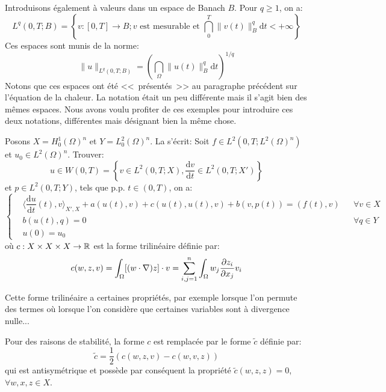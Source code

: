 \medskip
Introduisons également  à valeurs dans un espace
de Banach $B$. Pour $q\ge1$, on a:
\begin{equation}
L^q(0,T;B) =\left\{ v: [0,T]\rightarrow B; v \text{ est mesurable  et }
\dint_0^T \|v(t)\|^q_B \mathrm dt<+\infty\right\}
\end{equation}
Ces espaces sont munis de la norme:
\begin{equation}
\|u\|_{L^q(0,T;B)} = \left(\dint_\Omega\|u(t)\|^q_B \mathrm dt\right)^{1/q}
\end{equation}
Notons que ces espaces ont été <<~présentés~>> au paragraphe précédent
sur l'équation de la chaleur. La notation était un peu différente mais il s'agit bien
des mêmes espaces. Nous avons voulu profiter de ces exemples pour introduire
ces deux notations, différentes mais désignant bien la même chose.

\medskip
Posons $X=H^1_0(\Omega)^n$ et $Y=L^2_0(\Omega)^n$.
\medskip
La  s'écrit: Soit $f\in L^2(0,T;L^2(\Omega)^n)$ et $u_0\in L^2(\Omega)^n$.
Trouver:
\begin{equation}u\in W(0,T)=\left\{v\in L^2(0,T;X), \dfrac{\mathrm dv}{\mathrm dt}\in L^2(0,T;X') \right\}\end{equation} et
$p\in L^2(0,T;Y)$, tels que p.p. $t\in(0,T)$, on a:
\begin{equation}\left\{
\begin{aligned}
&\langle\dfrac{\mathrm du}{\mathrm dt}(t),v\rangle_{X',X}+a(u(t),v)+c(u(t),u(t),v)+b(v,p(t)) = (f(t),v) &&
\forall v\in X\\
&b(u(t),q) =0 &&\forall q \in Y\\
&u(0)=u_0
\end{aligned}\right.
\end{equation}
où $c: X\times X\times X\rightarrow\mathbb R$ est la forme trilinéaire définie par:
\begin{equation}
c(w,z,v) = \dint_\Omega [(w\cdot\nabla)z]\cdot v %
=\dsum_{i,j=1}^n \dint_\Omega w_j\dfrac{\partial z_i}{\partial x_j} v_i %
\end{equation}

\medskip
Cette forme trilinéaire a certaines propriétés, par exemple lorsque l'on permute
des termes où lorsque l'on considère que certaines variables sont à divergence nulle...

\medskip
Pour des raisons de stabilité, la forme $c$ est remplacée par le forme $\tilde{c}$ définie par:
\begin{equation}
\tilde{c} = \dfrac12 \left(c(w,z,v)-c(w,v,z)\right)
\end{equation}
qui est antisymétrique et possède par conséquent la propriété $\tilde{c}(w,z,z)=0$,
$\forall w,x,z \in X$.

